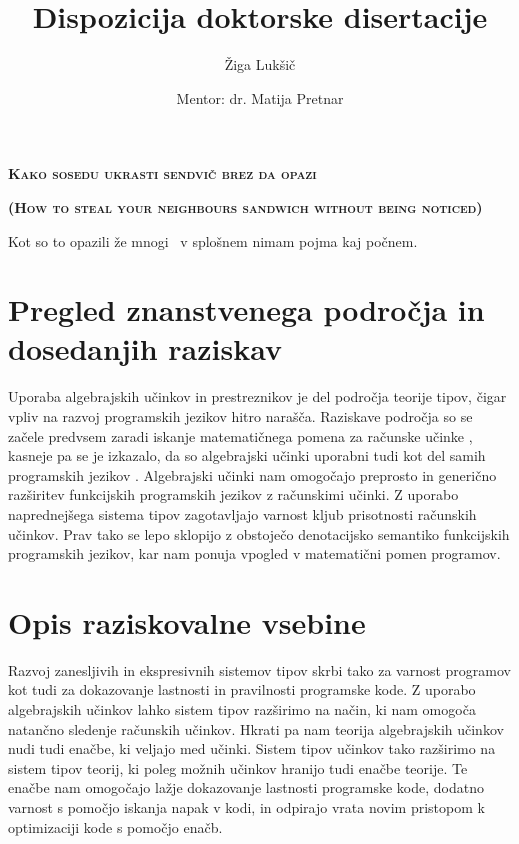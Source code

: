 \documentclass{article}
\title{Dispozicija doktorske disertacije}
\author{Žiga Lukšič \and Mentor: dr. Matija Pretnar}
\date{}
\begin{document}
\maketitle

\vspace{-10mm}
\begin{center}
  \Large{\textsc{\textbf{Kako sosedu ukrasti sendvič brez da opazi}}}

  \Large{\textsc{\textbf{(How to steal your neighbours sandwich without being noticed)}}}
\end{center}

Kot so to opazili že mnogi~\cite{DBLP:conf/icfp/KammarLO13,DBLP:journals/entcs/Pretnar15,DBLP:journals/pacmpl/Ahman18} v splošnem nimam pojma kaj počnem.


\section*{Pregled znanstvenega področja in dosedanjih raziskav}

Uporaba algebrajskih učinkov in prestreznikov je del področja teorije tipov, čigar vpliv na razvoj programskih jezikov hitro narašča. Raziskave področja so se začele predvsem zaradi iskanje matematičnega pomena za računske učinke \cite{DBLP:conf/fossacs/PlotkinP01, DBLP:journals/acs/PlotkinP03}, kasneje pa se je izkazalo, da so algebrajski učinki uporabni tudi kot del samih programskih jezikov \cite{DBLP:journals/corr/PlotkinP13}. Algebrajski učinki nam omogočajo preprosto in generično razširitev funkcijskih programskih jezikov z računskimi učinki. Z uporabo naprednejšega sistema tipov \cite{DBLP:conf/esop/SalehKPS18} zagotavljajo varnost kljub prisotnosti računskih učinkov. Prav tako se lepo sklopijo z obstoječo denotacijsko semantiko funkcijskih programskih jezikov, kar nam ponuja vpogled v matematični pomen programov. 

\section*{Opis raziskovalne vsebine}

Razvoj zanesljivih in ekspresivnih sistemov tipov skrbi tako za varnost programov kot tudi za dokazovanje lastnosti in pravilnosti programske kode. Z uporabo algebrajskih učinkov lahko sistem tipov razširimo na način, ki nam omogoča natančno sledenje računskih učinkov. Hkrati pa nam teorija algebrajskih učinkov nudi tudi enačbe, ki veljajo med učinki. Sistem tipov učinkov tako razširimo na sistem tipov teorij, ki poleg možnih učinkov hranijo tudi enačbe teorije. Te enačbe nam omogočajo lažje dokazovanje lastnosti programske kode, dodatno varnost s pomočjo iskanja napak v kodi, in odpirajo vrata novim pristopom k optimizaciji kode s pomočjo enačb.
\end{document}
